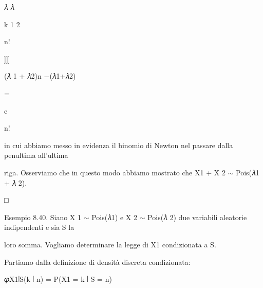 \documentclass[a4paper,portrait,12pt]{article}
\begin{document}
\begin{flushleft}
𝜆 𝜆
\end{flushleft}


\begin{flushleft}
k 1 2
\end{flushleft}


\begin{flushleft}
n!
\end{flushleft}





]]]





\begin{flushleft}
(𝜆 1 + 𝜆2)n $-$(𝜆1+𝜆2)
\end{flushleft}


=


\begin{flushleft}
e
\end{flushleft}


\begin{flushleft}
n!
\end{flushleft}


\begin{flushleft}
in cui abbiamo messo in evidenza il binomio di Newton nel passare dalla penultima all'ultima
\end{flushleft}


\begin{flushleft}
riga. Osserviamo che in questo modo abbiamo mostrato che X1 + X 2 $\sim$ Pois(𝜆1 + 𝜆 2).
\end{flushleft}


□


\begin{flushleft}
Esempio 8.40. Siano X 1 $\sim$ Pois(𝜆1) e X 2 $\sim$ Pois(𝜆 2) due variabili aleatorie indipendenti e sia S la
\end{flushleft}


\begin{flushleft}
loro somma. Vogliamo determinare la legge di X1 condizionata a S.
\end{flushleft}


\begin{flushleft}
Partiamo dalla definizione di densit\`{a} discreta condizionata:
\end{flushleft}


\begin{flushleft}
𝜑X1∣S(k ∣ n) = P(X1 = k ∣ S = n)
\end{flushleft}
\end{document}
